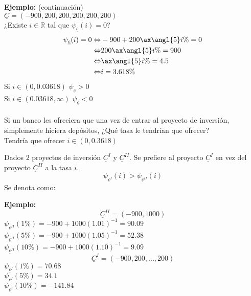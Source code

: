 \textbf{Ejemplo:} (continuación)\\
$\underline{C} = (-900,200,200,200,200,200)$\\
¿Existe $i \in \mathbb{R}$ tal que $\psi_{\underline{c}}(i) = 0$?
\begin{align*}
    \psi_{\underline{c}}(i) = 0 \Leftrightarrow & -900+200\ax{\angl{5}i\%} = 0\\
    \Leftrightarrow & 200  \ax{\angl{5}i\%} = 900\\
    \Leftrightarrow &  \ax{\angl{5}i\%} = 4.5\\
    \Leftrightarrow & i = 3.618\%
\end{align*}
Si $i \in (0,0.03618)$ \phantom{abcde}
$\psi_{\underline{c}}>0$\\
Si $i \in (0.03618,\infty)$ \phantom{abcd}
$\psi_{\underline{c}}<0$\\ \\
Si un banco les ofreciera que una vez de entrar al proyecto de inversión, simplemente hiciera depósitos, ¿Qué tasa le tendrían que ofrecer? \\
Tendría que ofrecer $i\in (0,0.3618)$\\
\begin{definition}
Dados 2 proyectos de inversión $\underline{C}^{I}$ y $\underline{C}^{II}$. Se prefiere al proyecto $\underline{C}^{I}$ en vez del proyecto $\underline{C}^{II}$ a la tasa $i$.
$$\psi_{\underline{c}^I}(i) >\psi_{\underline{c}^{II}}(i)$$
Se denota como:
\begin{center}
    



\end{center}
\end{definition}
\textbf{Ejemplo:}
$$\underline{C}^{II} = (-900,1000)$$
$\psi_{\underline{c}^{II}}(1\%) = -900 + 1000 (1.01)^{-1}=90.09$\\
$\psi_{\underline{c}^{II}}(5\%)=-900 + 1000 (1.05)^{-1}= 52.38$\\
$\psi_{\underline{c}^{II}}(10\%)=-900 + 1000 (1.10)^{-1}= 9.09$
$$\underline{C}^{I} = (-900,200,...,200)$$
$\psi_{\underline{c}^{I}}(1\%) = 70.68$\\
$\psi_{\underline{c}^{I}}(5\%) = 34.1$\\
$\psi_{\underline{c}^{I}}(10\%) = -141.84$

